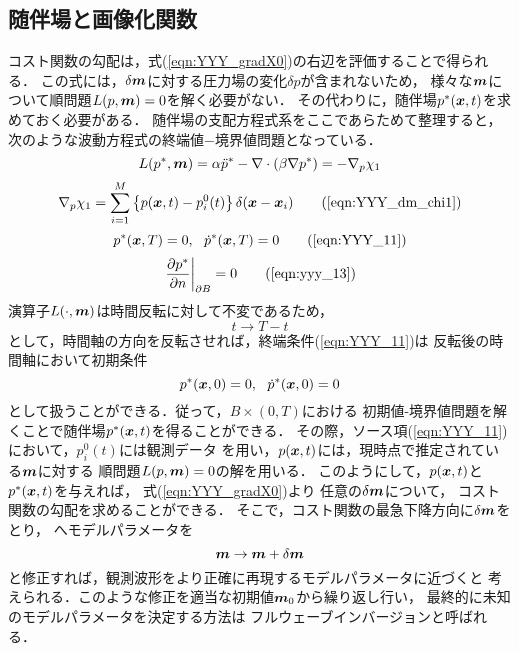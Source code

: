 \subsection{随伴場と画像化関数}
コスト関数の勾配は，式(\ref{eqn:YYY_gradX0})の右辺を評価することで得られる．
この式には，$\delta\mbox{\boldmath $m$}$に対する圧力場の変化$\delta p$が含まれないため，
様々な$\mbox{\boldmath $m$}$について順問題$L(p,\mbox{\boldmath $m$})=0$を解く必要がない．
その代わりに，随伴場$p^*(\mbox{\boldmath $x$},t)$を求めておく必要がある．
随伴場の支配方程式系をここであらためて整理すると，
次のような波動方程式の終端値−境界値問題となっている．
\begin{equation}
	L(p^*,\mbox{\boldmath $m$})=
	\alpha \ddot{p}^* -\nabla\cdot \left( \beta \nabla p^* \right)
	=	
	-\nabla_p\chi_1
	\label{eqn:YYY_adj_PDE_rep}
\end{equation}
\begin{equation}
	\nabla_p \chi_1 =
	\sum_{i=1}^M \left\{p(\fat{x},t)-p^0_i(t)\right\} \delta(\fat{x}-\fat{x}_i)
	\tag{\ref{eqn:YYY_dm_chi1}}
\end{equation}
\begin{equation}
	p^*(\fat{x},T)=0, \ \ \dot{p}^*(\fat{x},T)=0
	\tag{\ref{eqn:YYY_11}}
\end{equation}
\begin{equation}
	\left. \frac{\partial p^*}{\partial n}\right|_{\partial B}=0
	\tag{\ref{eqn:yyy_13}}
\end{equation}
演算子$L(\cdot,\mbox{\boldmath $m$})$は時間反転に対して不変であるため，
\begin{equation}
	t \rightarrow T-t
	\label{eqn:}
\end{equation}
として，時間軸の方向を反転させれば，終端条件(\ref{eqn:YYY_11})は
反転後の時間軸において初期条件
\begin{equation}
	p^*(\mbox{\boldmath $x$},0)=0, \ \ \dot{p}^*(\mbox{\boldmath $x$},0)=0
	\label{eqn:YYY_IC_adj}
\end{equation}
として扱うことができる．従って，$B\times (0,T)$における
初期値-境界値問題を解くことで随伴場$p^*(\mbox{\boldmath $x$},t)$を得ることができる．
その際，ソース項(\ref{eqn:YYY_11})において，$p^{0}_i(t)$には観測データ
を用い，$p(\mbox{\boldmath $x$},t)$には，現時点で推定されている$\mbox{\boldmath $m$}$に対する
順問題$L(p,\mbox{\boldmath $m$})=0$の解を用いる．
このようにして，$p(\mbox{\boldmath $x$},t)$と$p^*(\mbox{\boldmath $x$},t)$を与えれば，
式(\ref{eqn:YYY_gradX0})より 任意の$\delta \mbox{\boldmath $m$}$について，
コスト関数の勾配を求めることができる．
そこで，コスト関数の最急下降方向に$\delta \mbox{\boldmath $m$}$をとり，
へモデルパラメータを
\begin{equation}
	\mbox{\boldmath $m$}\rightarrow \mbox{\boldmath $m$}+ \delta \mbox{\boldmath $m$}
	\label{eqn:}
\end{equation}
と修正すれば，観測波形をより正確に再現するモデルパラメータに近づくと
考えられる．このような修正を適当な初期値$\mbox{\boldmath $m$}_0$から繰り返し行い，
最終的に未知のモデルパラメータを決定する方法は
フルウェーブインバージョンと呼ばれる．\\

